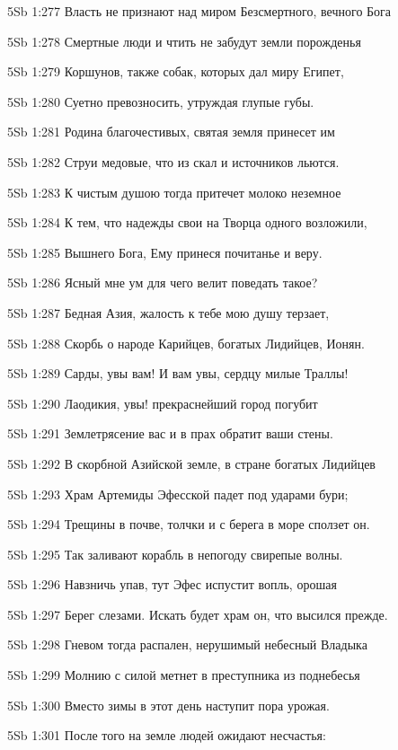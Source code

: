 \vs 5Sb 1:277 Власть не признают над миром Безсмертного, вечного Бога 

\vs 5Sb 1:278 Смертные люди и чтить не забудут земли порожденья  

\vs 5Sb 1:279 Коршунов, также собак, которых дал миру Египет,

\vs 5Sb 1:280 Суетно превозносить, утруждая глупые губы. 

\vs 5Sb 1:281 Родина благочестивых, святая земля принесет им 

\vs 5Sb 1:282 Струи медовые, что из скал и источников льются.

\vs 5Sb 1:283 К чистым душою тогда притечет молоко неземное  

\vs 5Sb 1:284 К тем, что надежды свои на Творца одного возложили, 

\vs 5Sb 1:285 Вышнего Бога, Ему принеся почитанье и веру.

\vs 5Sb 1:286 Ясный мне ум для чего велит поведать такое? 

\vs 5Sb 1:287 Бедная Азия, жалость к тебе мою душу терзает, 

\vs 5Sb 1:288 Скорбь о народе Карийцев, богатых Лидийцев, Ионян. 

\vs 5Sb 1:289 Сарды, увы вам! И вам увы, сердцу милые Траллы! 

\vs 5Sb 1:290 Лаодикия, увы! прекраснейший город  погубит 

\vs 5Sb 1:291 Землетрясение вас и в прах обратит ваши стены.

\vs 5Sb 1:292 В скорбной Азийской земле, в стране богатых Лидийцев 

\vs 5Sb 1:293 Храм Артемиды Эфесской падет под ударами бури; 

\vs 5Sb 1:294 Трещины в почве, толчки  и с берега в море сползет он. 

\vs 5Sb 1:295 Так заливают корабль в непогоду свирепые волны. 

\vs 5Sb 1:296 Навзничь упав, тут Эфес испустит вопль, орошая 

\vs 5Sb 1:297 Берег слезами. Искать будет храм он, что высился прежде.

\vs 5Sb 1:298 Гневом тогда распален, нерушимый небесный Владыка 

\vs 5Sb 1:299 Молнию с силой метнет в преступника из поднебесья 

\vs 5Sb 1:300 Вместо зимы в этот день наступит пора урожая. 

\vs 5Sb 1:301 После того на земле людей ожидают несчастья: 

